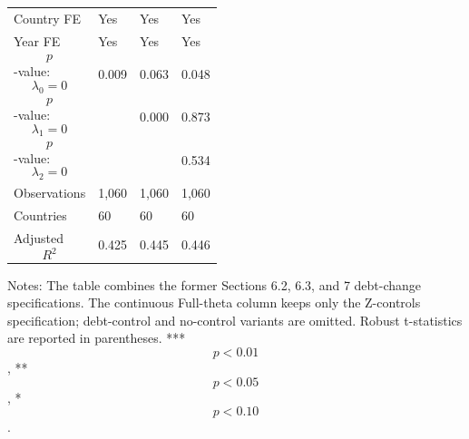 \begin{table}[H]
\begin{threeparttable}
\begin{tabularx}{\textwidth}{lYYY}
Country FE & Yes & Yes & Yes \\
Year FE & Yes & Yes & Yes \\
$$p$$-value: $$\lambda_0=0$$ & 0.009 & 0.063 & 0.048 \\
$$p$$-value: $$\lambda_1=0$$ &  & 0.000 & 0.873 \\
$$p$$-value: $$\lambda_2=0$$ &  &  & 0.534 \\
Observations & 1,060 & 1,060 & 1,060 \\
Countries & 60 & 60 & 60 \\
Adjusted $$R^2$$ & 0.425 & 0.445 & 0.446 \\
\bottomrule
\end{tabularx}
\begin{tablenotes}[flushleft]\footnotesize
\item Notes: The table combines the former Sections 6.2, 6.3, and 7 debt-change specifications. The continuous Full-theta column keeps only the Z-controls specification; debt-control and no-control variants are omitted. Robust t-statistics are reported in parentheses. *** $$p<0.01$$, ** $$p<0.05$$, * $$p<0.10$$.
\end{tablenotes}
\end{threeparttable}
\end{table}
